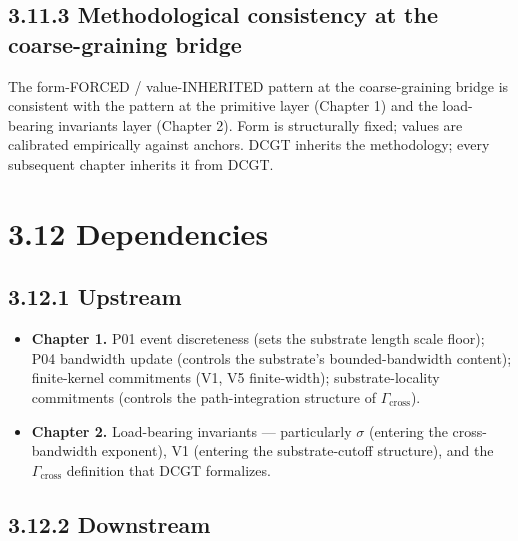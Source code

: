 \documentclass[11pt]{book}
\begin{document}
\subsection{3.11.3 Methodological consistency at the coarse-graining bridge}

The form-FORCED / value-INHERITED pattern at the coarse-graining bridge is consistent with the pattern at the primitive layer (Chapter 1) and the load-bearing invariants layer (Chapter 2). Form is structurally fixed; values are calibrated empirically against anchors. DCGT inherits the methodology; every subsequent chapter inherits it from DCGT.

\section{3.12 Dependencies}

\subsection{3.12.1 Upstream}

\begin{itemize}
\item \textbf{Chapter 1.} P01 event discreteness (sets the substrate length scale floor); P04 bandwidth update (controls the substrate's bounded-bandwidth content); finite-kernel commitments (V1, V5 finite-width); substrate-locality commitments (controls the path-integration structure of $\Gamma_\mathrm{cross}$).
\item \textbf{Chapter 2.} Load-bearing invariants — particularly $\sigma$ (entering the cross-bandwidth exponent), V1 (entering the substrate-cutoff structure), and the $\Gamma_\mathrm{cross}$ definition that DCGT formalizes.
\end{itemize}

\subsection{3.12.2 Downstream}
\end{document}
